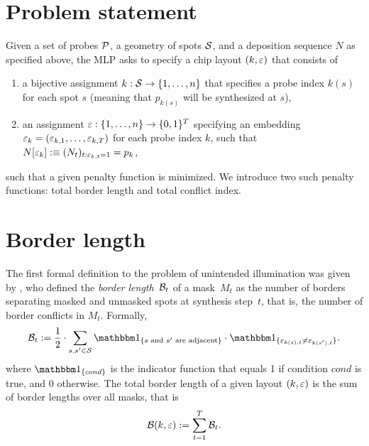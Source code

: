 \section{Problem statement}
\label{sec:mlp_problem}

Given a set of probes ${\mathcal{P}}$, a geometry of spots ${\mathcal{S}}$, and a deposition
sequence $N$ as specified above, the MLP asks to specify a chip layout
$(k,\varepsilon)$ that consists of
\begin{enumerate}
\item a bijective assignment $k: {\mathcal{S}}\to \{1,\dots,n\}$ that specifies a probe
  index $k(s)$ for each spot $s$ (meaning that $p_{k(s)}$ will be synthesized at
  $s$),
\item an assignment $\varepsilon: \{1,\dots,n\}\to \{0,1\}^T$ specifying an embedding
  $\varepsilon_k = (\varepsilon_{k,1},\dots,\varepsilon_{k,T})$ for each probe index $k$, such that
  $N[\varepsilon_k] :\equiv (N_t)_{t: \varepsilon_{k,t}=1} = p_k$,
\end{enumerate}
such that a given penalty function is minimized.  We introduce two such penalty
functions: total border length and total conflict index.


\section{Border length}
\label{sec:mlp_border_length}

The first formal definition to the problem of unintended illumination was given
by \citet{Hannenhalli2002}, who defined the \emph{border length}~${\mathcal{B}}_t$ of a
mask~$M_{t}$ as the number of borders separating masked and unmasked spots at
synthesis step~$t$, that is, the number of border conflicts in $M_{t}$.
Formally,
\begin{equation}
\label{eq:border_length}
  \CalB_t := \frac{1}{2} \cdot \sum_{s,s' \in \CalS}
    \Ind{s \text{ and } s' \text{ are adjacent}}
    \cdot \Ind{\eps_{k(s),t} \neq \eps_{k(s'),t}}.
\end{equation}
where $\Ind{cond}$ is the indicator function that equals 1 if condition $cond$
is true, and 0 otherwise. The total border length of a given layout $(k,\varepsilon)$
is the sum of border lengths over all masks, that is
\begin{equation}
\label{eq:total_border_length}
  {\mathcal{B}}(k,\varepsilon) := \sum_{t=1}^{T} {\mathcal{B}}_t.
\end{equation}

